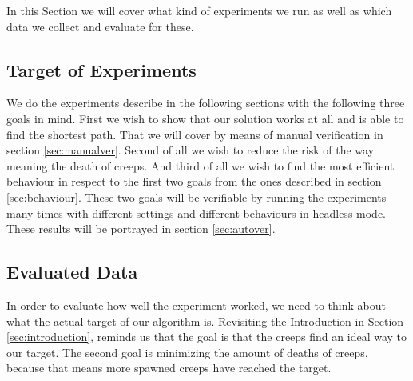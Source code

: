 In this Section we will cover what kind of experiments we run as well as which data we collect and evaluate for these.

\subsection{Target of Experiments}
We do the experiments describe in the following sections with the following three goals in mind.
First we wish to show that our solution works at all and is able to find the shortest path. That we will cover by means of manual verification in section \ref{sec:manualver}.
Second of all we wish to reduce the risk of the way meaning the death of creeps. And third of all we wish to find the most efficient behaviour in respect to the first two goals from the ones described in section \ref{sec:behaviour}. These two goals will be verifiable by running the experiments many times with different settings and different behaviours in headless mode. These results will be portrayed in section \ref{sec:autover}.

\subsection{Evaluated Data}
\label{sec:experimentevdata}

In order to evaluate how well the experiment worked, we need to think about what the actual target of our algorithm is. Revisiting the Introduction in Section \ref{sec:introduction}, reminds us that the goal is that the creeps find an ideal way to our target. The second goal is minimizing the amount of deaths of creeps, because that means more spawned creeps have reached the target.


